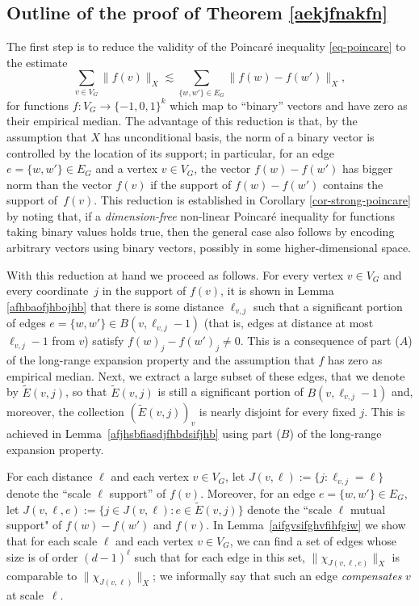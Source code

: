 \documentclass[11pt,leqno]{amsart}
\theoremstyle{remark}
\theoremstyle{plain}
\begin{document}
\subsection{Outline of the proof of Theorem \ref{aekjfnakfn}}

The first step is to reduce the validity of the Poincar\'{e} inequality  \eqref{eq-poincare}
to the estimate
\begin{equation} \label{expo-new}
\sum_{v\in V_G} \|f(v)\|_X \lesssim \sum_{\{w,w'\}\in E_G} \|f(w)-f(w')\|_X,
\end{equation}
for functions $f\colon V_G\to \{-1,0,1\}^k$ which map to ``binary'' vectors and have zero as their empirical median.
The advantage of this reduction is that, by the assumption that $X$ has unconditional basis,
the norm of a binary vector is controlled by the location of its support; in particular, for an edge $e=\{w,w'\}\in E_G$
and a vertex $v\in V_G$, the vector $f(w)-f(w')$ has bigger norm than the vector $f(v)$ if the support
of $f(w)-f(w')$ contains the support of~$f(v)$. This reduction is established in Corollary \ref{cor-strong-poincare}
by noting that, if a \textit{dimension-free} non-linear Poincar\'e inequality for functions taking binary values holds true,
then the general case also follows by encoding arbitrary vectors using binary vectors, possibly in some higher-dimensional space.

With this reduction at hand we proceed as follows. For every vertex $v\in V_G$
and every coordinate~$j$ in the support of $f(v)$, it is shown in Lemma \ref{afhbaofjhbojhb}
that there is some distance $\ell_{v,j}$ such that a significant portion of edges $e=\{w,w'\}\in B(v,\ell_{v,j}-1)$
(that is, edges at distance at most $\ell_{v,j}-1$ from $v$) satisfy $f(w)_j-f(w')_j \neq 0$. This is a consequence of
part (\hyperref[Part-A]{$A$}) of the long-range expansion property and the assumption that $f$ has zero as empirical median.
Next, we extract a large subset of these edges, that we denote by $\tilde E(v,j)$, so that $\tilde E(v,j)$ is still a
significant portion of $B(v,\ell_{v,j}-1)$ and, moreover, the collection $(\tilde E(v,j))_v$ is nearly disjoint
for every fixed $j$. This is achieved in Lemma~\ref{afjhsbfiasdjfhbdsifjhb} using part (\hyperref[Part-B]{$B$})
of the long-range expansion property.

For each distance $\ell$ and each vertex $v\in V_G$, let $J(v,\ell):= \{j\colon \ell_{v,j} = \ell\}$ denote
the ``scale $\ell$ support'' of $f(v)$. Moreover, for an edge $e=\{w,w'\}\in E_G$, let
$J(v,\ell,e):= \{j \in J(v,\ell)\colon e \in \tilde E(v,j)\}$ denote the ``scale $\ell$ mutual support" of $f(w)-f(w')$ and $f(v)$.
In Lemma~\ref{aifgvsifghvfihfgiw} we show that for each scale $\ell$ and each vertex $v\in V_G$, we can find a set of edges
whose size is of order $(d-1)^\ell$ such that for each edge in this set, $\|\chi_{J(v,\ell,e)}\|_X$ is comparable to
$\|\chi_{J(v,\ell)}\|_X$; we informally say that such an edge \emph{compensates} $v$ at scale~$\ell$.
\end{document}
